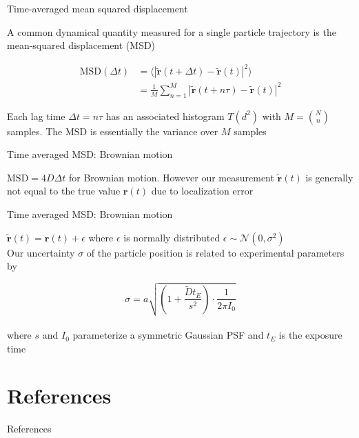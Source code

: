 \documentclass{beamer}					%
\begin{document}
\begin{frame}{Time-averaged mean squared displacement}

A common dynamical quantity measured for a single particle trajectory is the mean-squared displacement (MSD)

\begin{align*}
\bm{\mathrm{MSD}}(\Delta t) &= \langle |\tilde{\bm{r}}(t+\Delta t) - \tilde{\bm{r}}(t)|^{2}\rangle\\
&=  \frac{1}{M}\sum_{n=1}^{M} |\tilde{\bm{r}}(t+n\tau) - \tilde{\bm{r}}(t)|^{2}
\end{align*}

Each lag time $\Delta t = n\tau$ has an associated histogram $T(d^{2})$ with $M = {N\choose n}$ samples. The $\bm{\mathrm{MSD}}$ is essentially the variance over $M$ samples

\end{frame}

\begin{frame}{Time averaged MSD: Brownian motion}

$\bm{\mathrm{MSD}} = 4D\Delta t$ for Brownian motion. However our measurement $\tilde{\bm{r}}(t)$ is generally not equal to the true value $\bm{r}(t)$ due to localization error\\
\vspace{0.2in}

\end{frame}

\begin{frame}{Time averaged MSD: Brownian motion}


$\tilde{\bm{r}}(t) = \bm{r}(t) + \epsilon$ where $\epsilon$ is normally distributed $\epsilon \sim \mathcal{N}(0,\sigma^{2})$\\
\vspace{0.1in}
Our uncertainty $\sigma$ of the particle position is related to experimental parameters by

\begin{equation*}
\sigma = a\sqrt{\left(1+\frac{\tilde{D}t_{E}}{s^{2}}\right)\cdot \frac{1}{2\pi I_{0}}}
\end{equation*}
\\
\vspace{0.2in}
where $s$ and $I_{0}$ parameterize a symmetric Gaussian PSF and $t_{E}$ is the exposure time

\end{frame}

\section{References}

\begin{frame}[allowframebreaks]{References}
	\tiny
	
\end{frame}
\end{document}
